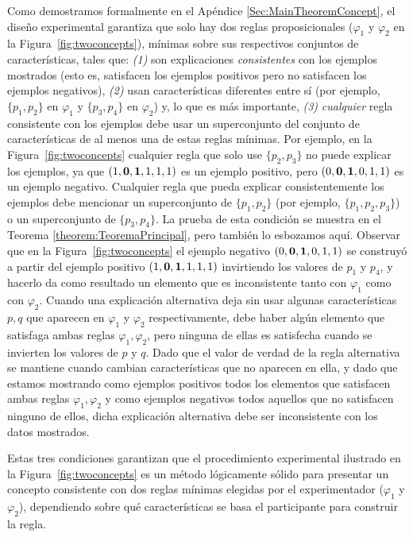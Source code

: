 \begin{enumerate}
	Como demostramos formalmente en el Apéndice \ref{Sec:MainTheoremConcept}, el diseño experimental garantiza que solo hay dos reglas proposicionales ($\varphi_1$ y $\varphi_2$ en la Figura~\ref{fig:twoconcepts}), mínimas sobre sus respectivos conjuntos de características, tales que: \textit{(1)} son explicaciones \textit{consistentes} con los ejemplos mostrados (esto es, satisfacen los ejemplos positivos pero no satisfacen los ejemplos negativos), \textit{(2)} usan características diferentes entre sí (por ejemplo, $\{p_1, p_2 \}$ en $\varphi_1$ y $\{p_3, p_4 \}$ en $\varphi_2 $) y, lo que es más importante, \textit {(3)} \textit{cualquier} regla consistente con los ejemplos debe usar un superconjunto del conjunto de características de al menos una de estas reglas mínimas. Por ejemplo, en la Figura~\ref{fig:twoconcepts} cualquier regla que solo use $\{p_2, p_3 \}$ no puede explicar los ejemplos, ya que $(1, {\bf 0}, {\bf 1}, 1 , 1,1)$ es un ejemplo positivo, pero $(0, {\bf 0}, {\bf 1}, 0,1,1)$ es un ejemplo negativo. Cualquier regla que pueda explicar consistentemente los ejemplos debe mencionar un superconjunto de $\{p_1, p_2 \}$ (por ejemplo, $\{p_1, p_2, p_3 \}$) o un superconjunto de $\{p_3, p_4 \}$. La prueba de esta condición se muestra en el Teorema \ref{theorem:TeoremaPrincipal}, pero también lo esbozamos aquí. Observar que en la Figura~\ref{fig:twoconcepts} el ejemplo negativo $(0, {\bf 0}, {\bf 1}, 0,1,1)$ se construyó a partir del ejemplo positivo $(1, {\bf 0}, {\bf 1}, 1,1,1)$ invirtiendo los valores de $p_1$ y $p_4$, y hacerlo da como resultado un elemento que es inconsistente tanto con $\varphi_1$ como con $\varphi_2$. Cuando una explicación alternativa deja sin usar algunas características $p,q$ que aparecen en $\varphi_1$ y $\varphi_2$ respectivamente, debe haber algún elemento que satisfaga ambas reglas $\varphi_1, \varphi_2$, pero ninguna de ellas es satisfecha cuando se invierten los valores de $p$ y $q$. Dado que el valor de verdad de la regla alternativa se mantiene cuando cambian características que no aparecen en ella, y dado que estamos mostrando como ejemplos positivos todos los elementos que satisfacen ambas reglas $\varphi_1, \varphi_2$ y como ejemplos negativos todos aquellos que no satisfacen ninguno de ellos, dicha explicación alternativa debe ser inconsistente con los datos mostrados.

	Estas tres condiciones garantizan que el procedimiento experimental ilustrado en la Figura~\ref{fig:twoconcepts} es un método lógicamente sólido para presentar un concepto consistente con dos reglas mínimas elegidas por el experimentador ($\varphi_1$ y $\varphi_2$), dependiendo sobre qué características se basa el participante para construir la regla.    


\end{enumerate}

